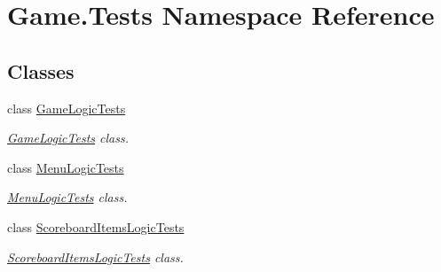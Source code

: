 \hypertarget{namespace_game_1_1_tests}{}\section{Game.\+Tests Namespace Reference}
\label{namespace_game_1_1_tests}
\subsection*{Classes}
\begin{DoxyCompactItemize}
\item 
class \mbox{\hyperlink{class_game_1_1_tests_1_1_game_logic_tests}{Game\+Logic\+Tests}}
\begin{DoxyCompactList}\small\item\em \mbox{\hyperlink{class_game_1_1_tests_1_1_game_logic_tests}{Game\+Logic\+Tests}} class. \end{DoxyCompactList}\item 
class \mbox{\hyperlink{class_game_1_1_tests_1_1_menu_logic_tests}{Menu\+Logic\+Tests}}
\begin{DoxyCompactList}\small\item\em \mbox{\hyperlink{class_game_1_1_tests_1_1_menu_logic_tests}{Menu\+Logic\+Tests}} class. \end{DoxyCompactList}\item 
class \mbox{\hyperlink{class_game_1_1_tests_1_1_scoreboard_items_logic_tests}{Scoreboard\+Items\+Logic\+Tests}}
\begin{DoxyCompactList}\small\item\em \mbox{\hyperlink{class_game_1_1_tests_1_1_scoreboard_items_logic_tests}{Scoreboard\+Items\+Logic\+Tests}} class. \end{DoxyCompactList}\end{DoxyCompactItemize}
